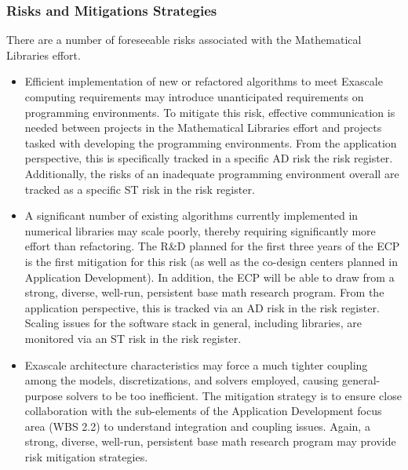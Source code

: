 \subsubsection{Risks and Mitigations Strategies}
There are a number of foreseeable risks associated with the Mathematical Libraries effort.
\begin{itemize}
	\item Efficient implementation of new or refactored algorithms to meet Exascale computing requirements may introduce unanticipated requirements on programming environments. To mitigate this risk, effective communication is needed between projects in the Mathematical Libraries effort and projects tasked with developing the programming environments. From the application perspective, this is specifically tracked in a specific AD risk the risk register. Additionally, the risks of an inadequate programming environment overall are tracked as a specific ST risk in the risk register.
	\item A significant number of existing algorithms currently implemented in numerical libraries may scale poorly, thereby requiring significantly more effort than refactoring. The R\&D planned for the first three years of the ECP is the first mitigation for this risk (as well as the co-design centers planned in Application Development). In addition, the ECP will be able to draw from a strong, diverse, well-run, persistent base math research program. From the application perspective, this is tracked via an AD risk in the risk register. Scaling issues for the software stack in general, including libraries, are monitored via an ST risk in the risk register.
	\item Exascale architecture characteristics may force a much tighter coupling among the models, discretizations, and solvers employed, causing general-purpose solvers to be too inefficient. The mitigation strategy is to ensure close collaboration with the sub-elements of the Application Development focus area (WBS 2.2) to understand integration and coupling issues. Again, a strong, diverse, well-run, persistent base math research program may provide risk mitigation strategies.
\end{itemize}

